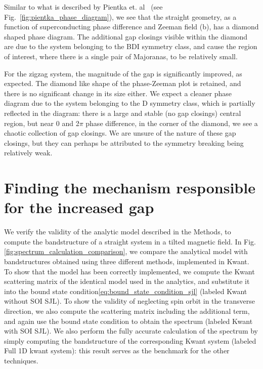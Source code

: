 			Similar to what is described by Pientka et. al~\cite{pientka2017topological} (see Fig.~\ref{fig:pientka_phase_diagram}), we see that the straight geometry, as a function of superconducting phase difference and Zeeman field (b), has a diamond shaped phase diagram.
			The additional gap closings visible within the diamond are due to the system belonging to the BDI symmetry class, and cause the region of interest, where there is a single pair of Majoranas, to be relatively small.
			
			For the zigzag system, the magnitude of the gap is significantly improved, as expected.
			The diamond like shape of the phase-Zeeman plot is retained, and there is no significant change in its size either.
			We expect a cleaner phase diagram due to the system belonging to the D symmetry class, which is partially reflected in the diagram: there is a large and stable (no gap closings) central region, but near 0 and 2$\pi$ phase difference, in the corner of the diamond, we see a chaotic collection of gap closings.
			We are unsure of the nature of these gap closings, but they can perhaps be attributed to the symmetry breaking being relatively weak.



	\section{Finding the mechanism responsible for the increased gap}
		We verify the validity of the analytic model described in the Methods, to compute the bandstructure of a straight system in a tilted magnetic field. 
		In Fig.\ref{fig:spectrum_calculation_comparison}, we compare the analytical model with bandstructures obtained using three different methods, implemented in Kwant.
		To show that the model has been correctly implemented, we compute the Kwant scattering matrix of the identical model used in the analytics, and substitute it into the bound state condition\eqref{eq:bound_state_condition_sjl} (labeled Kwant without SOI SJL).
		To show the validity of neglecting spin orbit in the transverse direction, we also compute the scattering matrix including the additional term, and again use the bound state condition to obtain the spectrum (labeled Kwant with SOI SJL).
		We also perform the fully accurate calculation of the spectrum by simply computing the bandstructure of the corresponding Kwant system (labeled Full 1D kwant system): this result serves as the benchmark for the other techniques.


